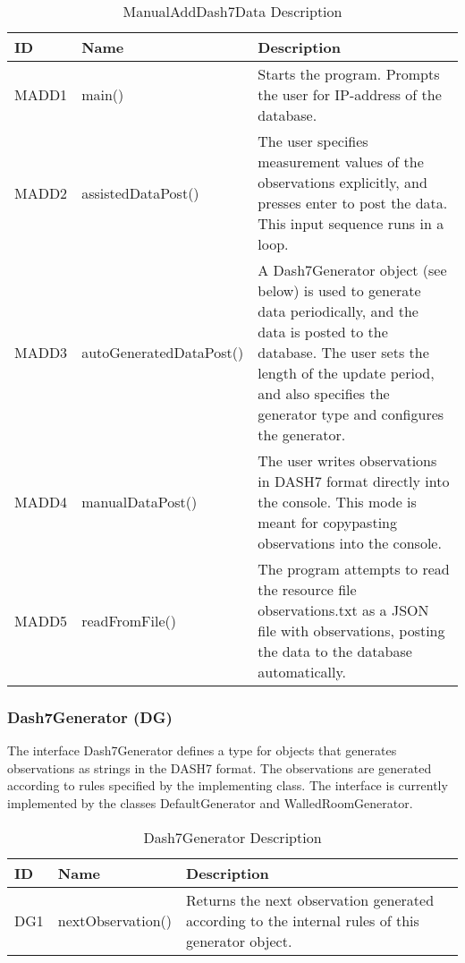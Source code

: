 \documentclass[../document]{subfiles}
\begin{document}
\begin{table}[H]
\caption{ManualAddDash7Data Description}
\centering
\begin{tabularx}{\textwidth}{|L{1.2cm}|L{4cm}|X|}
\hline 
ID
&Name
&Description
\\ \hline MADD1
&main()
&Starts the program. Prompts the user for IP-address of the database.
\\ \hline MADD2
&assistedDataPost()
&The user specifies measurement values of the observations explicitly, and presses enter to post the data. This input sequence runs in a loop.
\\ \hline MADD3
&autoGeneratedDataPost()
&A Dash7Generator object (see below) is used to generate data periodically, and the data is posted to the database. The user sets the length of the update period, and also specifies the generator type and configures the generator.
\\ \hline MADD4
&manualDataPost()
&The user writes observations in DASH7 format directly into the console. This mode is meant for copypasting observations into the console.
\\ \hline MADD5
&readFromFile()
&The program attempts to read the resource file observations.txt as a \gls{JSON} file with observations, posting the data to the database automatically.

\\ \hline 
\end{tabularx}
\end{table}

\subsubsection{Dash7Generator (DG)}
The interface Dash7Generator defines a type for objects that generates observations as strings in the DASH7 format. The observations are generated according to rules specified by the implementing class. The interface is currently implemented by the classes DefaultGenerator and WalledRoomGenerator.

\begin{table}[H]
\caption{Dash7Generator Description}
\centering
\begin{tabularx}{\textwidth}{|L{1.2cm}|L{3.5cm}|X|}
\hline ID
&Name
&Description
\\ \hline 
DG1
&nextObservation()
&Returns the next observation generated according to the internal rules of this generator object.
\\ \hline 
\end{tabularx}
\end{table}
\end{document}
